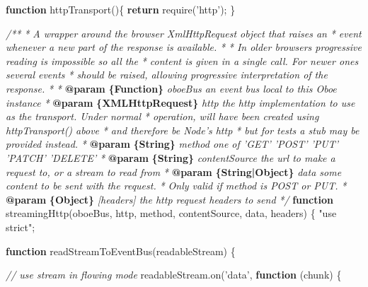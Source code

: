 \documentclass[12pt, ]{article}
\newenvironment{Shaded}{}{}
\newcommand{\KeywordTok}[1]{\textcolor[rgb]{0.00,0.44,0.13}{\textbf{{#1}}}}
\newcommand{\StringTok}[1]{\textcolor[rgb]{0.25,0.44,0.63}{{#1}}}
\newcommand{\CommentTok}[1]{\textcolor[rgb]{0.38,0.63,0.69}{\textit{{#1}}}}
\newcommand{\OtherTok}[1]{\textcolor[rgb]{0.00,0.44,0.13}{{#1}}}
\newcommand{\FunctionTok}[1]{\textcolor[rgb]{0.02,0.16,0.49}{{#1}}}
\newcommand{\NormalTok}[1]{{#1}}
\begin{document}
\begin{Shaded}
\begin{Highlighting}[]
\KeywordTok{function} \FunctionTok{httpTransport}\NormalTok{()\{}
   \KeywordTok{return} \FunctionTok{require}\NormalTok{(}\StringTok{'http'}\NormalTok{);}
\NormalTok{\}}

\CommentTok{/**}
\CommentTok{ * A wrapper around the browser XmlHttpRequest object that raises an }
\CommentTok{ * event whenever a new part of the response is available.}
\CommentTok{ * }
\CommentTok{ * In older browsers progressive reading is impossible so all the }
\CommentTok{ * content is given in a single call. For newer ones several events}
\CommentTok{ * should be raised, allowing progressive interpretation of the response.}
\CommentTok{ *      }
\CommentTok{ * }\KeywordTok{@param}\CommentTok{ }\KeywordTok{\{Function\}}\CommentTok{ oboeBus an event bus local to this Oboe instance}
\CommentTok{ * }\KeywordTok{@param}\CommentTok{ }\KeywordTok{\{XMLHttpRequest\}}\CommentTok{ http the http implementation to use as the transport. Under normal}
\CommentTok{ *          operation, will have been created using httpTransport() above}
\CommentTok{ *          and therefore be Node's http}
\CommentTok{ *          but for tests a stub may be provided instead.}
\CommentTok{ * }\KeywordTok{@param}\CommentTok{ }\KeywordTok{\{String\}}\CommentTok{ method one of 'GET' 'POST' 'PUT' 'PATCH' 'DELETE'}
\CommentTok{ * }\KeywordTok{@param}\CommentTok{ }\KeywordTok{\{String\}}\CommentTok{ contentSource the url to make a request to, or a stream to read from}
\CommentTok{ * }\KeywordTok{@param}\CommentTok{ }\KeywordTok{\{String|Object\}}\CommentTok{ data some content to be sent with the request.}
\CommentTok{ *                        Only valid if method is POST or PUT.}
\CommentTok{ * }\KeywordTok{@param}\CommentTok{ }\KeywordTok{\{Object\}}\CommentTok{ [headers] the http request headers to send                       }
\CommentTok{ */}  
\KeywordTok{function} \FunctionTok{streamingHttp}\NormalTok{(oboeBus, http, method, contentSource, data, headers) \{}
   \StringTok{"use strict"}\NormalTok{;}

   \KeywordTok{function} \FunctionTok{readStreamToEventBus}\NormalTok{(readableStream) \{}
         
      \CommentTok{// use stream in flowing mode   }
      \OtherTok{readableStream}\NormalTok{.}\FunctionTok{on}\NormalTok{(}\StringTok{'data'}\NormalTok{, }\KeywordTok{function} \NormalTok{(chunk) \{}
                                             

\end{Highlighting}
\end{Shaded}
\end{document}
